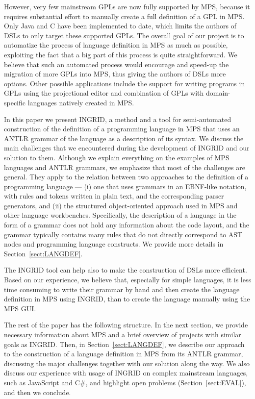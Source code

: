 However, very few mainstream GPLs are now fully supported by MPS, because it requires substantial effort to manually create a full definition of a GPL in MPS.
Only Java and C have been implemented to date, which limits the authors of DSLs to only target these supported GPLs.
The overall goal of our project is to automatize the process of language definition in MPS as much as possible, exploiting the fact that a big part of this process is quite straightforward.
We believe that such an automated process would encourage and speed-up the migration of more GPLs into MPS, thus giving the authors of DSLs more options.
Other possible applications include the support for writing programs in GPLs using the projectional editor and combination of GPLs with domain-specific languages natively created in MPS.

In this paper we present INGRID, a method and a tool for semi-automated construction of the definition of a programming language in MPS that uses an ANTLR grammar of the language as a description of its syntax.
We discuss the main challenges that we encountered during the development of INGRID and our solution to them.
Although we explain everything on the examples of MPS languages and ANTLR grammars, we emphasize that most of the challenges are general. 
They apply to the relation between two approaches to the definition of a programming language --- (i) one that uses grammars in an EBNF-like notation, with rules and tokens written in plain text, and the corresponding parser generators, and (ii) the structured object-oriented approach used in MPS and other language workbenches.
Specifically, the description of a language in the form of a grammar does not hold any information about the code layout, and the grammar typically contains many rules that do not directly correspond to AST nodes and programming language constructs.
We provide more details in Section~\ref{sect:LANGDEF}.

The INGRID tool can help also to make the construction of DSLs more efficient.
Based on our experience, we believe that, especially for simple languages, it is less time consuming to write their grammar by hand and then create the language definition in MPS using INGRID, than to create the language manually using the MPS GUI.


The rest of the paper has the following structure.
In the next section, we provide necessary information about MPS and a brief overview of projects with similar goals as INGRID.
Then, in Section~\ref{sect:LANGDEF}, we describe our approach to the construction of a language definition in MPS from its ANTLR grammar, discussing the major challenges together with our solution along the way.
We also discuss our experience with usage of INGRID on complex mainstream languages, such as JavaScript and C\#, and highlight open problems (Section~\ref{sect:EVAL}), and then we conclude.

